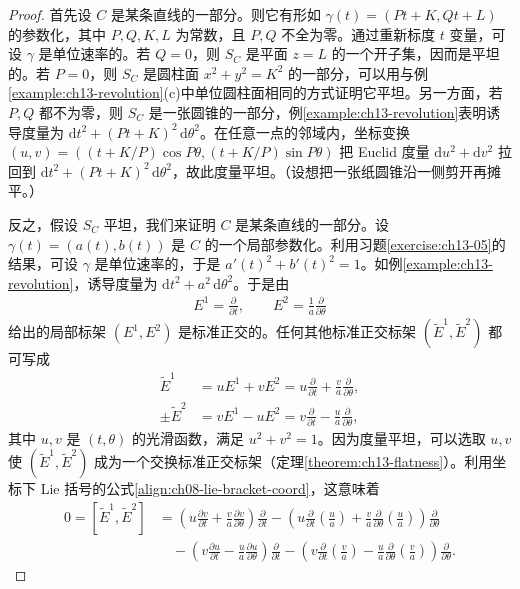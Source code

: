 \documentclass[../../main.tex]{subfiles}
\begin{document}
\begin{proof}
首先设 $C$ 是某条直线的一部分。则它有形如 $\gamma(t)=(Pt+K,Qt+L)$ 的参数化，其中 $P,Q,K,L$ 为常数，且 $P,Q$ 不全为零。通过重新标度 $t$ 变量，可设 $\gamma$ 是单位速率的。若 $Q=0$，则 $S_C$ 是平面 $z=L$ 的一个开子集，因而是平坦的。若 $P=0$，则 $S_C$ 是圆柱面 $x^2+y^2=K^2$ 的一部分，可以用与例\ref{example:ch13-revolution}(c)中单位圆柱面相同的方式证明它平坦。另一方面，若 $P,Q$ 都不为零，则 $S_C$ 是一张圆锥的一部分，例\ref{example:ch13-revolution}表明诱导度量为 $\mathrm{d}t^2+(Pt+K)^2\,\mathrm{d}\theta^2$。在任意一点的邻域内，坐标变换 $(u,v)=((t+K/P)\cos P\theta,(t+K/P)\sin P\theta)$ 把 Euclid 度量 $\mathrm{d}u^2+\mathrm{d}v^2$ 拉回到 $\mathrm{d}t^2+(Pt+K)^2\,\mathrm{d}\theta^2$，故此度量平坦。（设想把一张纸圆锥沿一侧剪开再摊平。）

反之，假设 $S_C$ 平坦，我们来证明 $C$ 是某条直线的一部分。设 $\gamma(t)=(a(t),b(t))$ 是 $C$ 的一个局部参数化。利用习题\ref{exercise:ch13-05}的结果，可设 $\gamma$ 是单位速率的，于是 $a'(t)^2+b'(t)^2=1$。如例\ref{example:ch13-revolution}，诱导度量为 $\mathrm{d}t^2+a^2\,\mathrm{d}\theta^2$。于是由
\begin{align*}
E^1=\frac{\partial}{\partial t},\qquad E^2=\frac1a\frac{\partial}{\partial\theta}
\end{align*}
给出的局部标架 $(E^1,E^2)$ 是标准正交的。任何其他标准正交标架 $(\widetilde E^1,\widetilde E^2)$ 都可写成
\begin{align*}
\widetilde E^1&=uE^1+vE^2=u\frac{\partial}{\partial t}+\frac va\frac{\partial}{\partial\theta},\\
\pm\widetilde E^2&=vE^1-uE^2=v\frac{\partial}{\partial t}-\frac ua\frac{\partial}{\partial\theta},
\end{align*}
其中 $u,v$ 是 $(t,\theta)$ 的光滑函数，满足 $u^2+v^2=1$。因为度量平坦，可以选取 $u,v$ 使 $(\widetilde E^1,\widetilde E^2)$ 成为一个交换标准正交标架（定理\ref{theorem:ch13-flatness}）。利用坐标下 Lie 括号的公式\eqref{align:ch08-lie-bracket-coord}，这意味着
\begin{align*}
0=[\widetilde E^1,\widetilde E^2]
&=\left(u\frac{\partial v}{\partial t}+\frac va\frac{\partial v}{\partial\theta}\right)\frac{\partial}{\partial t}
-\left(u\frac{\partial}{\partial t}\!\left(\frac ua\right)+\frac va\frac{\partial}{\partial\theta}\!\left(\frac ua\right)\right)\frac{\partial}{\partial\theta}\\
&\quad-\left(v\frac{\partial u}{\partial t}-\frac ua\frac{\partial u}{\partial\theta}\right)\frac{\partial}{\partial t}
-\left(v\frac{\partial}{\partial t}\!\left(\frac va\right)-\frac ua\frac{\partial}{\partial\theta}\!\left(\frac va\right)\right)\frac{\partial}{\partial\theta}.

\end{align*}
\end{proof}
\end{document}
